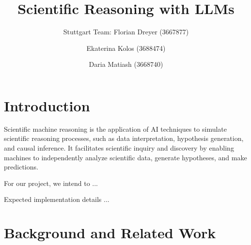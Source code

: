 \documentclass[10pt]{article}
\begin{document}
\title{Scientific Reasoning with LLMs}

\author{Stuttgart Team: Florian Dreyer (3667877) \and Ekaterina Kolos (3688474) \and Daria Matiash (3668740)}

\maketitle             


\section{Introduction}

Scientific machine reasoning is the application of AI techniques to simulate scientific reasoning processes, such as  data interpretation, hypothesis generation, and causal inference. It facilitates scientific inquiry and discovery by enabling machines to independently analyze scientific data, generate hypotheses, and make predictions.

For our project, we intend to ...

Expected implementation details ...

\section{Background and Related Work}
\end{document}
